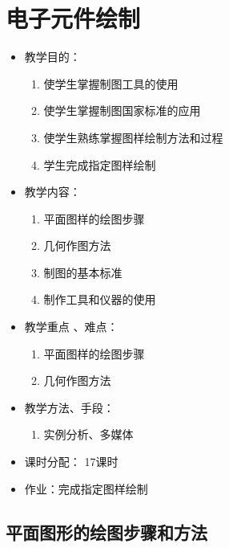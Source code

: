 \chapter{电子元件绘制}
\begin{itemize}
\item 教学目的：
\begin{enumerate}
\item 使学生掌握制图工具的使用
\item 使学生掌握制图国家标准的应用
\item 使学生熟练掌握图样绘制方法和过程
\item 学生完成指定图样绘制
\end{enumerate}
\item 教学内容：
\begin{enumerate}
\item 平面图样的绘图步骤
\item 几何作图方法
\item 制图的基本标准
\item 制作工具和仪器的使用
\end{enumerate}
\item 教学重点 、难点：
\begin{enumerate}
\item 平面图样的绘图步骤
\item 几何作图方法
\end{enumerate}
\item 教学方法、手段：
\begin{enumerate}
\item 实例分析、多媒体
\end{enumerate}
\item 课时分配：
17课时
\item 作业：完成指定图样绘制
\end{itemize}

\section{平面图形的绘图步骤和方法}

